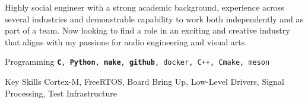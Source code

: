 
    Highly social engineer with a strong academic background, experience across several industries and demonstrable capability to work both independently and as part of a team.
    Now looking to find a role in an exciting and creative industry that aligns with my passions for audio engineering and visual arts.

\begin{cvskills}

  \cvskill
    {Programming} %
    {\texttt{\textbf{C}, \textbf{Python}, \textbf{make}, \textbf{github}, docker, C++, Cmake, meson}} %

  \cvskill
    {Key Skills} %
    {Cortex-M, FreeRTOS, Board Bring Up, Low-Level Drivers, Signal Processing, Test Infrastructure} %

\end{cvskills}
